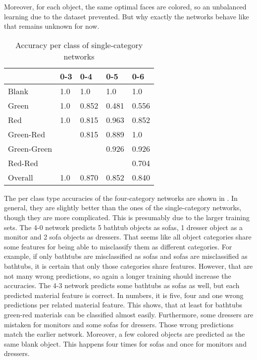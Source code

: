 Moreover, for each object, the same optimal faces are colored, so an unbalanced learning due to the dataset prevented.
But why exactly the networks behave like that remains unknown for now. 
\begin{table}[]
	\centering
	\caption{Accuracy per class of single-category networks}
	\label{tab:single-category-accuracies}
	\begin{tabular}{l|llll}
		            & 0-3 & 0-4   & 0-5   & 0-6   \\ \hline
		Blank       & 1.0 & 1.0   & 1.0   & 1.0   \\
		Green       & 1.0 & 0.852 & 0.481 & 0.556 \\
		Red         & 1.0 & 0.815 & 0.963 & 0.852 \\
		Green-Red   &     & 0.815 & 0.889 & 1.0   \\
		Green-Green &     &       & 0.926 & 0.926 \\
		Red-Red     &     &       &       & 0.704 \\ \hline
		Overall		& 1.0 & 0.870 & 0.852 & 0.840 \\
	\end{tabular}
\end{table}
The per class type accuracies of the four-category networks are shown in .
In general, they are slightly better than the ones of the single-category networks, though they are more complicated.
This is presumably due to the larger training sets.
The 4-0 network predicts 5 bathtub objects as sofas, 1 dresser object as a monitor and 2 sofa objects as dressers.
That seems like all object categories share some features for being able to misclassify them as different categories.
For example, if only bathtubs are misclassified as sofas and sofas are misclassified as bathtubs, it is certain that only those categories share features.
However, that are not many wrong predictions, so again a longer training should increase the accuracies.
The 4-3 network predicts some bathtubs as sofas as well, but each predicted material feature is correct.
In numbers, it is five, four and one wrong predictions per related material feature.
This shows, that at least for bathtubs green-red materials can be classified almost easily.
Furthermore, some dressers are mistaken for monitors and some sofas for dressers.
Those wrong predictions match the earlier network.
Moreover, a few colored objects are predicted as the same blank object.
This happens four times for sofas and once for monitors and dressers.

